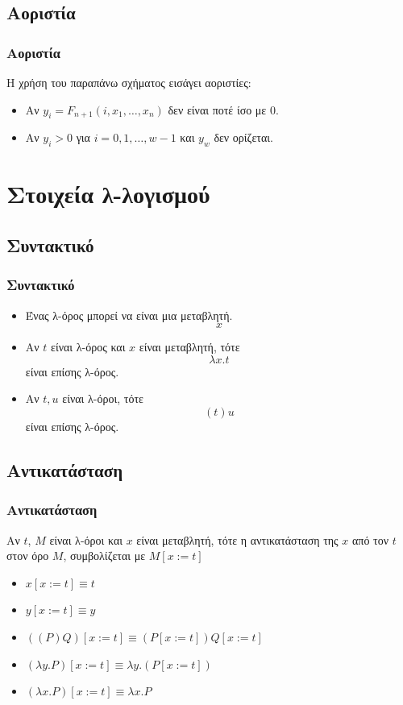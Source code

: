 \documentclass{beamer}
\begin{document}
\subsection{Αοριστία}

\begin{frame}
  \frametitle{Αοριστία}
  Η χρήση του παραπάνω σχήματος εισάγει αοριστίες:
  \begin{itemize}
  \item Αν $y_i = F_{n+1}(i, x_1,\ldots, x_n)$ δεν είναι ποτέ ίσο με
    $0$.
  \item Αν $y_i > 0$ για $i=0,1,\ldots,w-1$ και $y_w$ δεν ορίζεται.
  \end{itemize}
\end{frame}

\section{Στοιχεία λ-λογισμού}

\subsection{Συντακτικό}

\begin{frame}
  \frametitle{Συντακτικό}
  \begin{itemize}
  \item Ένας λ-όρος μπορεί να είναι μια μεταβλητή.$$x$$
  \item Αν $t$ είναι λ-όρος και $x$ είναι μεταβλητή, τότε $$\lambda
    x.t$$ είναι επίσης λ-όρος.
  \item Αν $t, u$ είναι λ-όροι, τότε $$(t)u$$ είναι επίσης λ-όρος.
  \end{itemize}
\end{frame}

\subsection{Αντικατάσταση}

\begin{frame}
  \frametitle{Αντικατάσταση}
  
  Αν $t$, $M$ είναι λ-όροι και $x$ είναι μεταβλητή, τότε η
  αντικατάσταση της $x$ από τον $t$ στον όρο $M$, συμβολίζεται με
  $M[x:=t]$
  \begin{itemize}
  \item $x[x:=t] \equiv t$
  \item $y[x:=t] \equiv y$
  \item $((P)Q)[x:=t] \equiv (P[x:=t])Q[x:=t]$
  \item $(\lambda y . P)[x:=t] \equiv \lambda y . (P[x:=t])$
  \item $(\lambda x . P)[x:=t] \equiv \lambda x . P$
  \end{itemize}
\end{frame}
\end{document}
